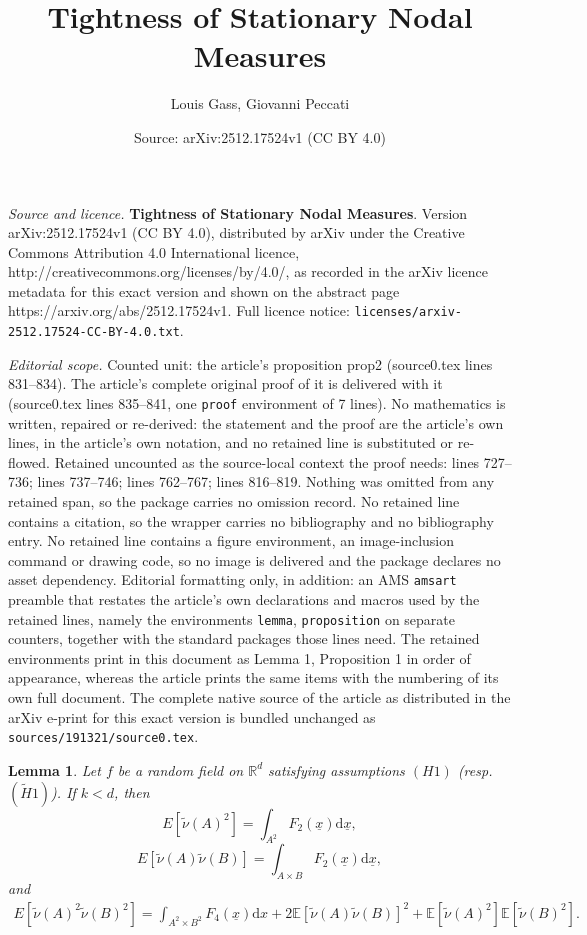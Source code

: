 \documentclass[10pt,a4paper]{amsart}
\title{{\bf Tightness of Stationary Nodal Measures}}
\author{Louis Gass, Giovanni Peccati}
\date{Source: arXiv:2512.17524v1 (CC BY 4.0)}
\newtheorem{lemma}{Lemma}
\newcommand\E{\mathbb{E}}
\newcommand\R{\mathbb{R}}
\newcommand\dd{\mathrm{d}}
\newcommand\nut{\tilde{\nu}}
\newcommand\x{\underline{x}}
\begin{document}
\maketitle

\noindent\emph{Source and licence.} {\bf Tightness of Stationary Nodal Measures}. Version arXiv:2512.17524v1 (CC BY 4.0), distributed by arXiv under the Creative Commons Attribution 4.0 International licence, http://creativecommons.org/licenses/by/4.0/, as recorded in the arXiv licence metadata for this exact version and shown on the abstract page https://arxiv.org/abs/2512.17524v1. Full licence notice: \texttt{licenses/arxiv-2512.17524-CC-BY-4.0.txt}.\par\smallskip

\noindent\textit{Editorial scope.} Counted unit: the article's proposition prop2 (source0.tex lines 831--834). The article's complete original proof of it is delivered with it (source0.tex lines 835--841, one \texttt{proof} environment of 7 lines). No mathematics is written, repaired or re-derived: the statement and the proof are the article's own lines, in the article's own notation, and no retained line is substituted or re-flowed.  Retained uncounted as the source-local context the proof needs: lines 727--736; lines 737--746; lines 762--767; lines 816--819.  Nothing was omitted from any retained span, so the package carries no omission record.  No retained line contains a citation, so the wrapper carries no bibliography and no bibliography entry.  No retained line contains a figure environment, an image-inclusion command or drawing code, so no image is delivered and the package declares no asset dependency.  Editorial formatting only, in addition: an AMS \texttt{amsart} preamble that restates the article's own declarations and macros used by the retained lines, namely the environments \texttt{lemma}, \texttt{proposition} on separate counters, together with the standard packages those lines need.  The retained environments print in this document as Lemma 1, Proposition 1 in order of appearance, whereas the article prints the same items with the numbering of its own full document.  The complete native source of the article as distributed in the arXiv e-print for this exact version is bundled unchanged as \texttt{sources/191321/source0.tex}.
\begin{lemma}
\label{lem1}
Let $f$ be a random field on $\R^d$ satisfying assumptions  $(H1)$ (resp. $(\widetilde{H}1)$). If $k<d$, then
\[E[\nut(A)^2] = \int_{A^2}F_2(\x)\dd \x,\]
\[E[\nut(A)\nut(B)] = \int_{A\times B} F_2(\x)\dd \x,\]
and
\begin{align*}
E[\nut(A)^2\nut(B)^2] = \int_{A^2\times B^2}F_4(\x)\dd x + 2\E[\nut(A)\nut(B)]^2 + \E[\nut(A)^2]\E[\nut(B)^2].
\end{align*}
\end{lemma}
\end{document}
